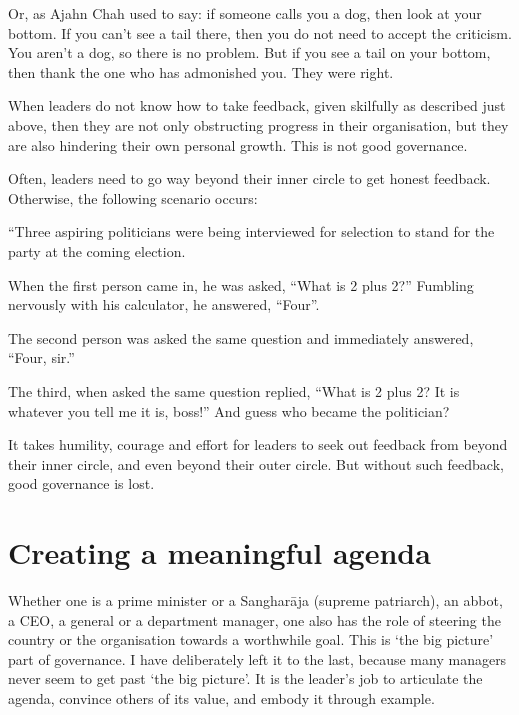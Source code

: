 ﻿\documentclass[11pt, openany]{book}
\begin{document}
Or, as Ajahn Chah used to say: if someone calls you a dog, then look at your bottom. If you can’t see a tail there, then you do not need to accept the criticism. You aren’t a dog, so there is no problem. But if you see a tail on your bottom, then thank the one who has admonished you. They were right.

When leaders do not know how to take feedback, given skilfully as described just above, then they are not only obstructing progress in their organisation, but they are also hindering their own personal growth. This is not good governance.

Often, leaders need to go way beyond their inner circle to get honest feedback. Otherwise, the following scenario occurs:

“Three aspiring politicians were being interviewed for selection to stand for the party at the coming election.

When the first person came in, he was asked, “What is 2 plus 2?” Fumbling nervously with his calculator, he answered, “Four”.

The second person was asked the same question and immediately answered, “Four, sir.”

The third, when asked the same question replied, “What is 2 plus 2? It is whatever you tell me it is, boss!” And guess who became the politician?

It takes humility, courage and effort for leaders to seek out feedback from beyond their inner circle, and even beyond their outer circle. But without such feedback, good governance is lost.

\section{Creating a meaningful agenda}

Whether one is a prime minister or a Sangharāja (supreme
 patriarch), an abbot, a CEO, a general or a department manager, one also has the role of steering the country or the organisation towards a worthwhile goal. This is ‘the big picture’ part of governance. I have deliberately left it to the last, because many managers never seem to get past ‘the big picture’. It is the leader’s job to articulate the agenda, convince others of its value, and embody it through example.
\end{document}
